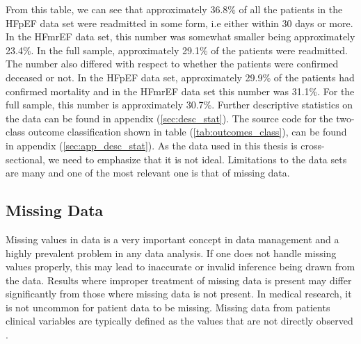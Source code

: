 \documentclass[../thesis.tex]{subfiles}
\begin{document}
\indent From this table, we can see that approximately 36.8\% of all the patients in the HFpEF data set were readmitted in some form, i.e either within 30 days or more. In the HFmrEF data set, this number was somewhat smaller being approximately 23.4\%. In the full sample, approximately 29.1\% of the patients were readmitted. The number also differed with respect to whether the patients were confirmed deceased or not. In the HFpEF data set, approximately 29.9\% of the patients had confirmed mortality and in the HFmrEF data set this number was 31.1\%. For the full sample, this number is approximately 30.7\%. Further descriptive statistics on the data can be found in appendix (\ref{sec:desc_stat}). The source code for the two-class outcome classification shown in table (\ref{tab:outcomes_class}), can be found in appendix (\ref{sec:app_desc_stat}). As the data used in this thesis is cross-sectional, we need to emphasize that it is not ideal. Limitations to the data sets are many and one of the most relevant one is that of missing data. 

\subsection{Missing Data}
\label{subsec:miss_data}

\noindent Missing values in data is a very important concept in data management and a highly prevalent problem in any data analysis. If one does not handle missing values properly, this may lead to inaccurate or invalid inference being drawn from the data. Results where improper treatment of missing data is present may differ significantly from those where missing data is not present. In medical research, it is not uncommon for patient data to be missing. Missing data from patients clinical variables are typically defined as the values that are not directly observed \citep{ibrahim2012missing}. 


\end{document}
